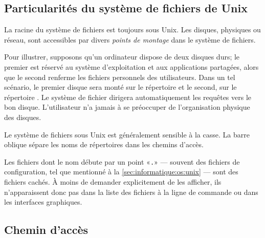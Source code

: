 \subsection{Particularités du système de fichiers de Unix}
\label{sec:informatique:fs:unix}

La racine du système de fichiers est toujours \code{/} sous Unix. Les
disques, physiques ou réseau, sont accessibles par divers \emph{points
  de montage} dans le système de fichiers.

Pour illustrer, supposons qu'un ordinateur dispose de deux disques
durs; le premier est réservé au système d'exploitation et aux
applications partagées, alors que le second renferme les fichiers
personnels des utilisateurs. Dans un tel scénario, le premier disque
sera monté sur le répertoire \code{/} et le second, sur le répertoire
. Le système de fichier dirigera automatiquement les
requêtes vers le bon disque. L'utilisateur n'a jamais à se préoccuper
de l'organisation physique des disques.


Le système de fichiers sous Unix est généralement sensible à la casse.
La barre oblique \code{/} sépare les noms de répertoires dans les
chemins d'accès.

Les fichiers dont le nom débute par un point «\verb=.=» --- souvent
des fichiers de configuration, tel que mentionné à la
\autoref{sec:informatique:os:unix} --- sont des fichiers cachés. À
moins de demander explicitement de les afficher, ils n'apparaissent
donc pas dans la liste des fichiers à la ligne de commande ou dans
les interfaces graphiques.

\subsection{Chemin d'accès}
\label{sec:informatique:fs:path}

